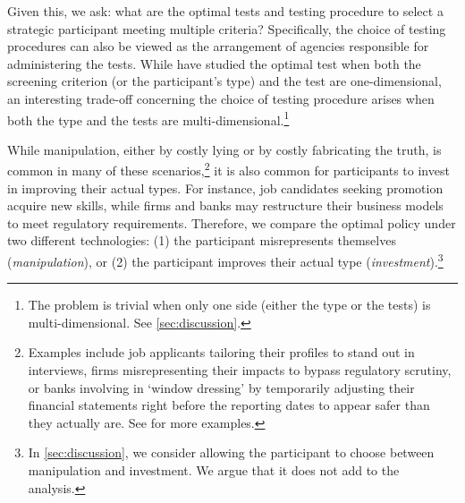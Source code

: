 Given this, we ask: what are the optimal tests and testing procedure to select a strategic participant meeting multiple criteria? Specifically, the choice of testing procedures can also be viewed as the arrangement of agencies responsible for administering the tests. While \citet{perez2022test} have studied the optimal test when both the screening criterion (or the participant's type) and the test are one-dimensional, an interesting trade-off concerning the choice of testing procedure arises when both the type and the tests are multi-dimensional.\footnote{The problem is trivial when only one side (either the type or the tests) is multi-dimensional. See \cref{sec:discussion}.}
 

While manipulation, either by costly lying or by costly fabricating the truth, is common in many of these scenarios,\footnote{Examples include job applicants tailoring their profiles to stand out in interviews, firms misrepresenting their impacts to bypass regulatory scrutiny, or banks involving in `window dressing' by temporarily adjusting their financial statements right before the reporting dates to appear safer than they actually are. See \citet{perez2022test,perez2024score, hardt2016strategic} for more examples.} it is also common for participants to invest in improving their actual types. For instance, job candidates seeking promotion acquire new skills, while firms and banks may restructure their business models to meet regulatory requirements.
Therefore, we compare the optimal policy under two different technologies: (1) the participant misrepresents themselves (\emph{manipulation}), or (2) the participant improves their actual type (\emph{investment}).\footnote{In \cref{sec:discussion}, we consider allowing the participant to choose between manipulation and investment. We argue that it does not add to the analysis. }



